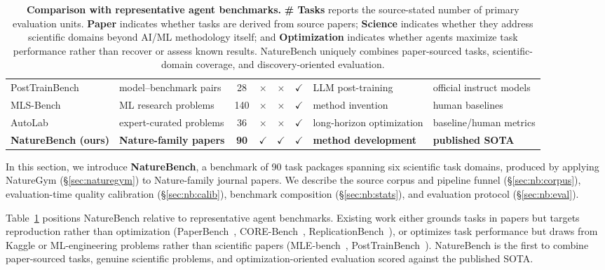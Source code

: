 \documentclass{llmxive}
\providecommand{\cmark}{\(\checkmark\)}
\providecommand{\xmark}{\(\times\)}
\begin{document}
\begin{table}[t]
{\begin{tabular}{@{}l l c c c c l l@{}}
\rowcolor{catorange}
PostTrainBench~\citep{rank2026posttrainbench} & model--benchmark pairs & 28 & \xmark & \xmark & \cmark & LLM post-training & official instruct models \\
\rowcolor{catorange}
MLS-Bench~\citep{lyu2026mlsbench} & ML research problems & 140 & \xmark & \xmark & \cmark & method invention & human baselines \\
\rowcolor{catorange}
AutoLab~\citep{xu2026autolab} & expert-curated problems & 36 & \xmark & \xmark & \cmark & long-horizon optimization & baseline/human metrics \\
\midrule
\rowcolor{catpurplestrong}
\textbf{NatureBench (ours)} & \textbf{Nature-family papers} & \textbf{90} & \textbf{\cmark} & \textbf{\cmark} & \textbf{\cmark} & \textbf{method development} & \textbf{published SOTA} \\
\bottomrule
\end{tabular}%
}
\caption{\textbf{Comparison with representative agent benchmarks.} \textbf{\# Tasks} reports the source-stated number of primary evaluation units. \textbf{Paper} indicates whether tasks are derived from source papers; \textbf{Science} indicates whether they address scientific domains beyond AI/ML methodology itself; and \textbf{Optimization} indicates whether agents maximize task performance rather than recover or assess known results. NatureBench uniquely combines paper-sourced tasks, scientific-domain coverage, and discovery-oriented evaluation.}
\label{tab:benchmark-comparison}
\end{table}


In this section, we introduce \textbf{NatureBench}, a benchmark of 90 task packages spanning six scientific task domains, produced by applying NatureGym (\S\ref{sec:naturegym}) to Nature-family journal papers.
We describe the source corpus and pipeline funnel (\S\ref{sec:nb:corpus}), evaluation-time quality calibration (\S\ref{sec:nb:calib}), benchmark composition (\S\ref{sec:nb:stats}), and evaluation protocol (\S\ref{sec:nb:eval}).

Table~\ref{tab:benchmark-comparison} positions NatureBench relative to representative agent benchmarks. Existing work either grounds tasks in papers but targets reproduction rather than optimization (PaperBench~\citep{starace2025paperbench}, CORE-Bench~\citep{siegel2024corebench}, ReplicationBench~\citep{ye2025replicationbench}), or optimizes task performance but draws from Kaggle or ML-engineering problems rather than scientific papers (MLE-bench~\citep{shern2024mlebench}, PostTrainBench~\citep{rank2026posttrainbench}). NatureBench is the first to combine paper-sourced tasks, genuine scientific problems, and optimization-oriented evaluation scored against the published SOTA.
\end{document}
